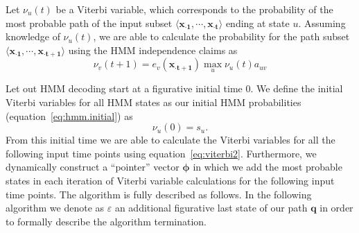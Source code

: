 Let $ \nu_u(t) $ be a Viterbi variable, which corresponds to the probability of the most probable path of the input subset $ \langle \mathbf{{x}_{\cdot 1}}, \cdots, \mathbf{{x}_{\cdot t}} \rangle $ ending at state $ u $. Assuming knowledge of $ \nu_u(t) $, we are able to calculate the probability for the path subset $ \langle \mathbf{{x}_{\cdot 1}}, \cdots, \mathbf{{x}_{\cdot t+1}} \rangle $ using the HMM independence claims as
\begin{equation}
  \label{eq:viterbi2}
  \nu_v(t+1) = e_v(\mathbf{{x}_{\cdot t+1}}) \max_{u} \nu_u(t) a_{uv}
\end{equation}

Let out HMM decoding start at a figurative initial time $ 0 $. We define the initial Viterbi variables for all HMM states as our initial HMM probabilities (equation~\ref{eq:hmm.initial}) as
\begin{equation}
  \label{eq:viterbi3}
  \nu_u(0) = s_u.
\end{equation}
From this initial time we are able to calculate the Viterbi variables for all the following input time points using equation~\ref{eq:viterbi2}. Furthermore, we dynamically construct a ``pointer'' vector $\boldsymbol\phi$ in which we add the most probable states in each iteration of Viterbi variable calculations for the following input time points. The algorithm is fully described as follows. In the following algorithm we denote as $ \varepsilon $ an additional figurative last state of our path $ \mathbf{q} $ in order to formally describe the algorithm termination.

\vspace{0.3cm}

